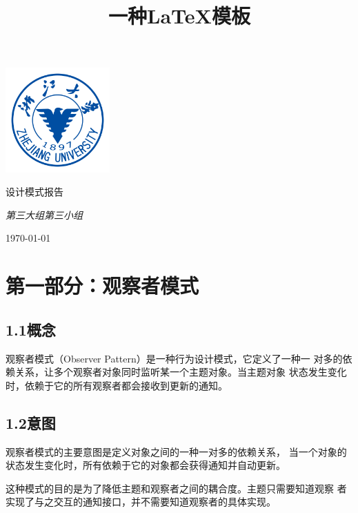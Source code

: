 \documentclass[24pt,a4paper]{article}%
\title{\fontsize{18pt}{27pt}\selectfont%
	{\heiti%
		一种\LaTeX 模板}}%
\date{}%
\begin{document}
\begin{titlepage}
    \centering
    \includegraphics[width=0.3\textwidth]{image/zju_logo.png}\par\vspace{5cm}
    {\huge\songti 设计模式报告\par}
    \vspace{1cm}
    {\Large\itshape 第三大组第三小组\par}
    \vspace{7cm}

    \vfill
    {\large \today\par}
\end{titlepage}
\newpage

\begin{center}
    \kaishu
    \tableofcontents
    \setcounter{page}{0}
    \thispagestyle{empty} %
\end{center}
\newpage

\section*{\songti 第一部分：观察者模式}
\subsection*{\songti 1.1概念}
观察者模式（Observer Pattern）是一种行为设计模式，它定义了一种一
对多的依赖关系，让多个观察者对象同时监听某一个主题对象。当主题对象
状态发生变化时，依赖于它的所有观察者都会接收到更新的通知。
\subsection*{\songti 1.2意图}
观察者模式的主要意图是定义对象之间的一种一对多的依赖关系，
当一个对象的状态发生变化时，所有依赖于它的对象都会获得通知并自动更新。

这种模式的目的是为了降低主题和观察者之间的耦合度。主题只需要知道观察
者实现了与之交互的通知接口，并不需要知道观察者的具体实现。
\end{document}
